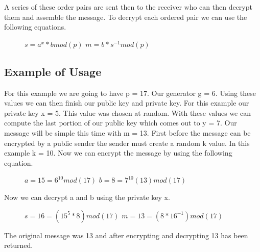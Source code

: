 \documentclass[conference]{IEEEtran}
\begin{document}
A series of these order pairs are sent then to the receiver who can then decrypt them and assemble the message. To decrypt each ordered pair we can use the following equations.

\begin{figure}[H]
	\begin{center}
		$s={a}^{x} * b mod\left(p\right)$ \newline
		$m=b * {s}^{-1} mod\left(p\right)$ \newline
	\end{center}
\end{figure}


\subsection{Example of Usage}
For this example we are going to have p = 17. Our generator g = 6. Using these values we can then finish our public key and private key. For this example our private key x = 5. This value was chosen at random. With these values we can compute the last portion of our public key which comes out to y = 7. Our message will be simple this time with m = 13. First before the message can be encrypted by a public sender the sender must create a random k value. In this example k = 10. Now we can encrypt the message by using the following equation. \newline

\begin{figure}[h]
	\begin{center}
		$a= 15 ={6}^{10}mod\left(17\right)$ \newline
		$b= 8  ={7}^{10}\left(13\right)mod\left(17\right)$ \newline
	\end{center}
\end{figure}

Now we can decrypt a and b using the private key x.

\begin{figure}[H]
	\begin{center}
		$s = 16 = \left( {15}^{5} * 8 \right) mod\left(17\right)$ \newline
		$m= 13 = \left(8 * {16}^{-1} \right) mod\left(17\right)$ \newline
	\end{center}
\end{figure}

The original message was 13 and after encrypting and decrypting 13 has been returned.
\end{document}
